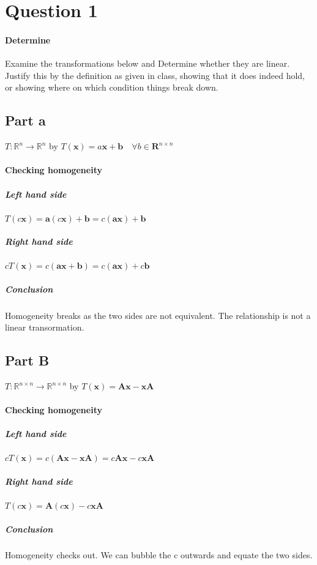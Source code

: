 \documentclass{article}
\begin{document}
    \section{Question 1}
        \paragraph{Determine}
            Examine the transformations below and Determine
            whether they are linear. Justify this by the
            definition as given in class, showing that it does
            indeed hold, or showing where on which condition things
            break down.
        \subsection{Part a}
            $T: \mathbb{R}^n\rightarrow \mathbb{R}^n$
            by
            $T(\mathbf{x})=a\mathbf{x}+\mathbf{b}\quad \forall{b}\in{\mathbf{R}^{n\times n}}$
            \paragraph{Checking homogeneity}
                \subparagraph{Left hand side}
                    $T(c\mathbf{x})=\mathbf{a} (c \mathbf{x})+\mathbf{b}=c(\mathbf{ax})+\mathbf{b}$
                \subparagraph{Right hand side}
                    $c T(\mathbf{x})=c(\mathbf{ax}+\mathbf{b})=c(\mathbf{ax})+c\mathbf{b}$
                \subparagraph{Conclusion}
                    Homogeneity breaks as the two sides are not equivalent. The relationship
                    is not a linear transormation.
        \subsection{Part B}
            $T: \mathbb{R}^{n \times n} \rightarrow \mathbb{R}^{n \times n}$
            by
            $T(\mathbf{x})=\mathbf{Ax}-\mathbf{xA}$
            \paragraph{Checking homogeneity}
                \subparagraph{Left hand side}
                    $cT(\mathbf{x})=c(\mathbf{Ax}-\mathbf{xA})=c\mathbf{Ax}-c\mathbf{xA}$
                \subparagraph{Right hand side}
                    $T(c\mathbf{x})=\mathbf{A}(c\mathbf{x})-c\mathbf{xA}$
                \subparagraph{Conclusion}
                    Homogeneity checks out. We can bubble the c outwards and equate the two sides.
\end{document}
